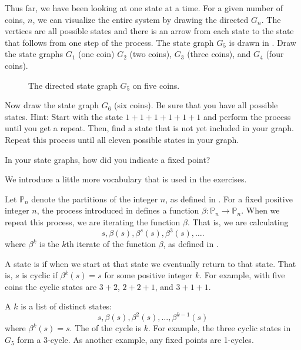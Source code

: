 \begin{act}
\begin{actpart}
            \item Thus far, we have been looking at one state at a time.  For a given number of coins, $n$, we can visualize the entire system by drawing the directed  $G_n$.  The vertices are all possible states and there is an arrow from each state to the state that follows from one step of the process.  The state graph $G_5$ is drawn in . Draw the state graphs $G_1$ (one coin) $G_2$ (two coins), $G_3$ (three coins), and $G_4$ (four coins). 
                \begin{figure}[hbtp]
                    \centering                   
                    
                    \caption{The directed state graph $G_5$ on five coins.}
                    \label{fig_state_graph_5coins}
                \end{figure}
            \item Now draw the state graph $G_6$ (six coins).  Be sure that you have all possible states.  Hint: Start with the state $1+1+1+1+1+1$ and perform the process until you get a repeat.  Then, find a state that is not yet included in your graph.  Repeat this process until all eleven possible states in your graph.

            \item In your state graphs, how did you indicate a fixed point?  
        \end{actpart}
\end{act}

We introduce a little more vocabulary that is used in the exercises.

\begin{defn}
\label{defn_cycles_cyclic_states}
    Let $\mathbb{P}_n$ denote the partitions of the integer $n$, as defined in .  For a fixed positive integer $n$, the  process introduced in  defines a function $\beta:\mathbb{P}_n \to \mathbb{P}_n$.  When we repeat this process, we are iterating the function $\beta$. That is, we are calculating
        $$s, \beta(s), \beta^s(s), \beta^3(s), \ldots.$$
    where $\beta^k$ is the $k$th iterate of the function $\beta$, as defined in . 
        \begin{apart}
            \item A state is  if when we start at that state we eventually return to that state.  That is, $s$ is cyclic if $\beta^k(s) = s$ for some positive integer $k$.  For example, with five coins the cyclic states are
            $3+2$, $2+2+1$, and $3+1+1$.
            \item A $k$ is a list of distinct states: $$s, \beta(s), \beta^2(s), \ldots, \beta^{k-1}(s)$$
            where $\beta^k(s) = s$. The  of the cycle is $k$. For example, the three cyclic states in $G_5$ form a 3-cycle. As another example, any fixed points are 1-cycles. 
        \end{apart}
\end{defn}

